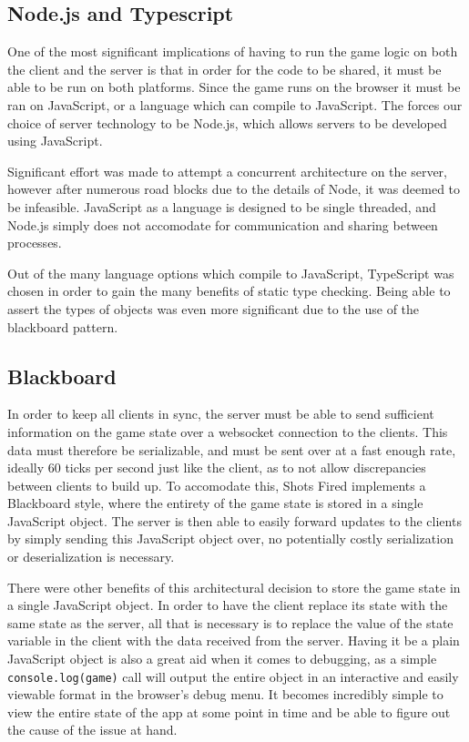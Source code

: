 \documentclass[12pt]{report}
\begin{document}
\subsection{Node.js and Typescript}
One of the most significant implications of having to run the game logic on both
the client and the server is that in order for the code to be shared, it must be
able to be run on both platforms.  Since the game runs on the browser it must
be ran on JavaScript, or a language which can compile to JavaScript.  The forces
our choice of server technology to be Node.js, which allows servers to be
developed using JavaScript.

Significant effort was made to attempt a concurrent architecture on the server,
however after numerous road blocks due to the details of Node, it was deemed
to be infeasible.  JavaScript as a language is designed to be single threaded,
and Node.js simply does not accomodate for communication and sharing between
processes.

Out of the many language options which compile to JavaScript, TypeScript was
chosen in order to gain the many benefits of static type checking.  Being able
to assert the types of objects was even more significant due to the use of the
blackboard pattern.

\subsection{Blackboard}
In order to keep all clients in sync, the server must be able to send
sufficient information on the game state over a websocket connection to the
clients.  This data must therefore be serializable, and must be sent over at a fast
enough rate, ideally 60 ticks per second just like the client, as to not allow
discrepancies between clients to build up.  To accomodate this, Shots Fired
implements a Blackboard style, where the entirety of the game state is stored in
a single JavaScript object.  The server is then able to easily forward updates
to the clients by simply sending this JavaScript object over, no potentially
costly serialization or deserialization is necessary.

There were other benefits of this architectural decision to store the game state in a
single JavaScript object.  In order to have the client replace its state with
the same state as the server, all that is necessary is to replace the value of
the state variable in the client with the data received from the server.  Having
it be a plain JavaScript object is also a great aid when it comes to debugging,
as a simple \texttt{console.log(game)} call will output the entire object in an
interactive and easily viewable format in the browser's debug menu.  It becomes
incredibly simple to view the entire state of the app at some point in time and
be able to figure out the cause of the issue at hand.
\end{document}
